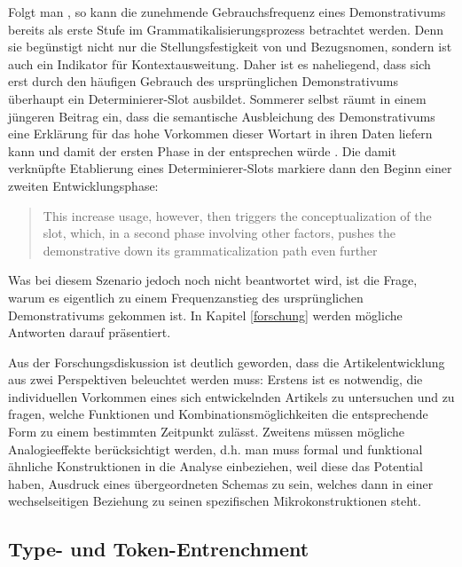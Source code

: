 Folgt man \textcite[194]{Himmelmann1997}, so kann die zunehmende Gebrauchsfrequenz eines Demonstrativums bereits als erste Stufe im Grammatikalisierungsprozess  betrachtet werden. Denn sie begünstigt nicht nur die Stellungsfestigkeit von  und Bezugsnomen, sondern ist auch ein Indikator für Kontextausweitung. Daher ist es naheliegend, dass sich erst durch den häufigen Gebrauch des ursprünglichen Demonstrativums überhaupt  ein Determinierer-Slot ausbildet. Sommerer selbst räumt in einem jüngeren Beitrag ein, dass die semantische Ausbleichung des Demonstrativums eine Erklärung für das hohe Vorkommen dieser Wortart in ihren Daten liefern kann und damit der ersten Phase in der  entsprechen würde \parencite[127]{Sommerer2015}. Die damit verknüpfte Etablierung eines Determinierer-Slots markiere dann den Beginn einer zweiten Entwicklungsphase: \blockcquote[127]{Sommerer2015}{This increase usage, however, then triggers the conceptualization of the slot, which, in a second phase involving other factors, pushes the demonstrative down its grammaticalization path even further}. 
Was bei diesem Szenario jedoch noch nicht beantwortet wird, ist die Frage, warum es eigentlich zu einem Frequenzanstieg des ursprünglichen Demonstrativums gekommen ist. In Kapitel \ref{forschung} werden mögliche Antworten darauf präsentiert. 


Aus der Forschungsdiskussion ist deutlich geworden, dass die Artikelentwicklung aus zwei Perspektiven beleuchtet werden muss:  Erstens ist es notwendig, die individuellen Vorkommen eines sich entwickelnden Artikels zu untersuchen und zu fragen, welche Funktionen und Kombinationsmöglichkeiten die entsprechende Form zu einem bestimmten Zeitpunkt zulässt. Zweitens müssen mögliche Analogieeffekte  berücksichtigt werden, d.h. man muss formal und funktional ähnliche Konstruktionen in die Analyse einbeziehen, weil diese das Potential haben, Ausdruck eines übergeordneten Schemas zu sein, welches dann in einer wechselseitigen Beziehung zu seinen spezifischen Mikrokonstruktionen steht. 

\subsection{Type- und Token-Entrenchment}\label{sec:entrenchment}

